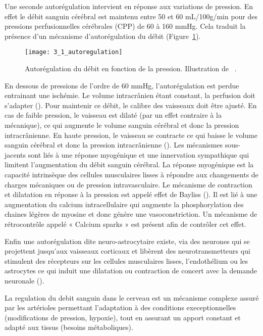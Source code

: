 Une seconde autorégulation intervient en réponse aux variations de pression. En effet le débit
sanguin cérébral est maintenu entre 50 et 60 mL/100g/min pour des pressions perfusionnelles cérébrales (CPP) de 60 à 160 mmHg. Cela traduit la présence d’un mécanisme d’autorégulation du
débit (Figure~\ref{fig:3_1_autoregulation}). 

\begin{figure}[!t]
\centering
\texttt{[image: 3\_1\_autoregulation]}
\caption{Autorégulation du débit en fonction de la pression. Illustration de ~\cite{Lang2003}.}
\label{fig:3_1_autoregulation}	
\end{figure}
En dessous de pressions de l’ordre de 60 mmHg, l’autorégulation est perdue
entrainant une ischémie. Le volume intracrânien étant constant, la perfusion doit s’adapter (\cite{Cipolla2009}). Pour
maintenir ce débit, le calibre des vaisseaux doit être ajusté. En cas de faible pression, le vaisseau est
dilaté (par un effet contraire à la mécanique), ce qui augmente le volume sanguin cérébral et donc la
pression intracrânienne. En haute pression, le vaisseau se contracte ce qui baisse le volume sanguin
cérébral et donc la pression intracrânienne (\cite{Lang2003}). Les mécanismes sous-jacents sont liés à une réponse
myogénique et une innervation sympathique qui limitent l’augmentation du débit sanguin cérébral. La
réponse myogénique est la capacité intrinsèque des cellules musculaires lisses à répondre aux
changements de charges mécaniques ou de pression intravasculaire. Le mécanisme de contraction et
dilatation en réponse à la pression est appelé effet de Bayliss (\cite{Cipolla2009}). Il est lié à une augmentation du
calcium intracellulaire qui augmente la phosphorylation des chaines légères de myosine et donc
génère une vasoconstriction. Un mécanisme de rétrocontrôle appelé « Calcium sparks » est présent
afin de contrôler cet effet.

Enfin une autorégulation dite neuro-astrocytaire existe, via des neurones qui se projettent
jusqu’aux vaisseaux corticaux et libèrent des neurotransmetteurs qui stimulent des récepteurs sur les
cellules musculaires lisses, l’endothélium ou les astrocytes ce qui induit une dilatation ou contraction
de concert avec la demande neuronale (\cite{Cipolla2009}).

La regulation du debit sanguin dans le cerveau est un mécanisme complexe assuré par les
artérioles permettant l’adaptation à des conditions execeptionnelles (modifications de pression,
hypoxie), tout en assurant un apport constant et adapté aux tissus (besoins métaboliques).

